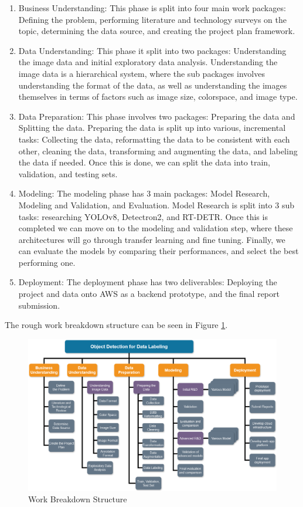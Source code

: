 \documentclass[stu,12pt,floatsintext]{apa7}
\begin{document}
\begin{enumerate}
	\item Business Understanding: This phase is split into four main work packages: Defining the problem, performing literature and technology surveys on the topic, determining the data source, and creating the project plan framework.

	\item Data Understanding: This phase it split into two packages: Understanding the image data and initial exploratory data analysis. Understanding the image data is a hierarchical system, where the sub packages involves understanding the format of the data, as well as understanding the images themselves in terms of factors such as image size, colorspace, and image type.

	\item Data Preparation: This phase involves two packages: Preparing the data and Splitting the data. Preparing the data is split up into various, incremental tasks: Collecting the data, reformatting the data to be consistent with each other, cleaning the data, transforming and augmenting the data, and labeling the data if needed. Once this is done, we can split the data into train, validation, and testing sets.

	\item Modeling: The modeling phase has 3 main packages: Model Research, Modeling and Validation, and Evaluation. Model Research is split into 3 sub tasks: researching YOLOv8, Detectron2, and RT-DETR. Once this is completed we can move on to the modeling and validation step, where these architectures will go through transfer learning and fine tuning. Finally, we can evaluate the models by comparing their performances, and select the best performing one.

	\item Deployment: The deployment phase has two deliverables: Deploying the project and data onto AWS as a backend prototype, and the final report submission.
\end{enumerate}

The rough work breakdown structure can be seen in Figure \ref{fig:wbs}.
\begin{figure}[!htb]
	\centering
	\includegraphics[width=1\linewidth]{./images/WBS.png}
	\caption{Work Breakdown Structure}
	\label{fig:wbs}
\end{figure}
\end{document}

